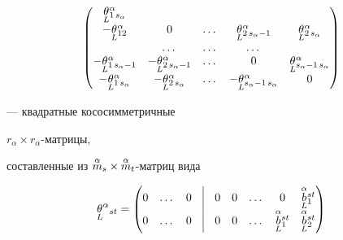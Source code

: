 \begin{thm}
\begin{equation}
\begin{pmatrix}
{\down{L}{\theta}}{}^{\alpha}_{1\, s_{\alpha}} \\


%


-{\down{L}{\theta}}{}^{\alpha}_{12} & 0 & \dotsc &


{\down{L}{\theta}}{}^{\alpha}_{2\, s_{\alpha}-1} &


{\down{L}{\theta}}{}^{\alpha}_{2\, s_{\alpha}} \\


%


& \dotsc & \dotsc & \dotsc & \\


%


-{\down{L}{\theta}}{}^{\alpha}_{1\, s_{\alpha}-1} &


-{\down{L}{\theta}}{}^{\alpha}_{2\, s_{\alpha}-1} & \dotsc & 0 &


{\down{L}{\theta}}{}^{\alpha}_{s_{\alpha}-1\, s_{\alpha}} \\


%


-{\down{L}{\theta}}{}^{\alpha}_{1\, s_{\alpha}} &


-{\down{L}{\theta}}{}^{\alpha}_{2\, s_{\alpha}} & \dotsc &


-{\down{L}{\theta}}{}^{\alpha}_{s_{\alpha}-1\, s_{\alpha}} & 0


\end{pmatrix}


\end{equation}


--- квадратные кососимметричные


$r_{\alpha}\times r_{\alpha}$-матрицы,


составленные из $\overset{\alpha}{m}_s\times \overset{\alpha}{m}_t$-матриц вида


\begin{equation} \label{29}


{\down{L}{\theta}}^{\alpha}{}_{st}=


\begin{pmatrix}


0 & \dotsc & 0 & \vline & 0 & 0 & \dotsc & 0 &


\up{\alpha}{\down{L}{b}}{}^{st}_1 \\


%


0 & \dotsc & 0 & \vline & 0


& 0 & \dotsc & \up{\alpha}{\down{L}{b}}{}^{st}_1 &


\up{\alpha}{\down{L}{b}}{}^{st}_2 \\



\end{pmatrix}
\end{equation}
\end{thm}
